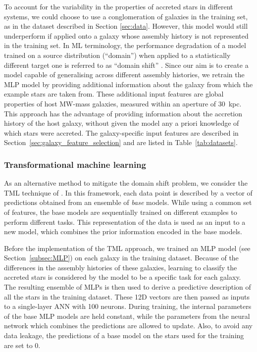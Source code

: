To account for the variability in the properties of accreted stars in different systems, we could choose to use a conglomeration of galaxies in the training set, as in the dataset described in Section \ref{sec:data}.  However, this model would still underperform if applied onto a galaxy whose assembly history is not represented in the training set. In ML terminology, the performance degradation of a model trained on a source distribution (``domain'') when applied to a statistically different target one is referred to as ``domain shift'' \citep{QuiñoneroCandela2009}.
Since our aim is to create a model capable of generalising across different assembly histories, we retrain the MLP model by providing additional information about the galaxy from which the example stars are taken from. These additional input features are global properties of host MW-mass galaxies, measured within an aperture of $30$~kpc. This approach has the advantage of providing information about the accretion history of the host galaxy, without given the model any a priori knowledge of which stars were accreted. The galaxy-specific input features are described in Section~\ref{sec:galaxy_feature_selection} and are listed in Table~\ref{tab:datasets}.

\subsubsection{Transformational machine learning}
\label{subsec:tml}

As an alternative method to mitigate the domain shift problem, we consider the TML technique of \citet{Olier2021}. In this framework, each data point is described by a vector of predictions obtained from an ensemble of \textit{base} models. While using a common set of features, the base models are sequentially trained on different examples to perform different tasks. This representation of the data is used as an input to a new model, which combines the prior information encoded in the base models.

Before the implementation of the TML approach, we trained an MLP model (see Section~\ref{subsec:MLP}) on each galaxy in the training dataset. Because of the differences in the assembly histories of these galaxies, learning to classify the accreted stars is considered by the model to be a specific task for each galaxy.  The resulting ensemble of MLPs is then used to derive a predictive description of all the stars in the training dataset. These 12D vectors are then passed as inputs to a single-layer ANN with 100 neurons. During training, the internal parameters of the base MLP models are held constant, while the parameters from the neural network which combines the predictions are allowed to update. Also, to avoid any data leakage, the predictions of a base model on the stars used for the training are set to $0$.

